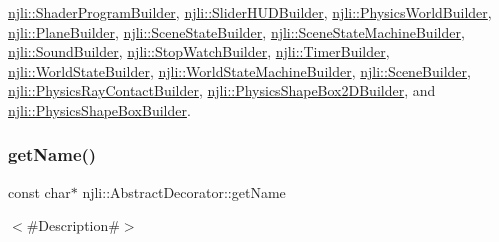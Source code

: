 \mbox{\hyperlink{classnjli_1_1_shader_program_builder_a131e91d141b0223cedebc6171de59b9b}{njli\+::\+Shader\+Program\+Builder}}, \mbox{\hyperlink{classnjli_1_1_slider_h_u_d_builder_ad290f966d4e75c073125443cee217c23}{njli\+::\+Slider\+H\+U\+D\+Builder}}, \mbox{\hyperlink{classnjli_1_1_physics_world_builder_ab046eaf50c425ccf120a4bd6f8702fe0}{njli\+::\+Physics\+World\+Builder}}, \mbox{\hyperlink{classnjli_1_1_plane_builder_a54fa171ecbf4e38cc79d54ad5f9e6d92}{njli\+::\+Plane\+Builder}}, \mbox{\hyperlink{classnjli_1_1_scene_state_builder_a6321171363bce444496fca0e11290835}{njli\+::\+Scene\+State\+Builder}}, \mbox{\hyperlink{classnjli_1_1_scene_state_machine_builder_aecc17e1921cac1cda12579de778d737a}{njli\+::\+Scene\+State\+Machine\+Builder}}, \mbox{\hyperlink{classnjli_1_1_sound_builder_afdebffb655601f61975dcd60f0aa1e50}{njli\+::\+Sound\+Builder}}, \mbox{\hyperlink{classnjli_1_1_stop_watch_builder_a186409ee0a19e75489cdab4bcf580d3a}{njli\+::\+Stop\+Watch\+Builder}}, \mbox{\hyperlink{classnjli_1_1_timer_builder_ab904ab539708d20ec75bb79b257220be}{njli\+::\+Timer\+Builder}}, \mbox{\hyperlink{classnjli_1_1_world_state_builder_abc990ca34261391470dcde9253746cc6}{njli\+::\+World\+State\+Builder}}, \mbox{\hyperlink{classnjli_1_1_world_state_machine_builder_a23c20795eb84296c30fc813cb901f8e4}{njli\+::\+World\+State\+Machine\+Builder}}, \mbox{\hyperlink{classnjli_1_1_scene_builder_af0655e6ef38a89ff1c8d663d5163fc91}{njli\+::\+Scene\+Builder}}, \mbox{\hyperlink{classnjli_1_1_physics_ray_contact_builder_a55fed195f3192a411c978c18a21c816a}{njli\+::\+Physics\+Ray\+Contact\+Builder}}, \mbox{\hyperlink{classnjli_1_1_physics_shape_box2_d_builder_ae6471440a74be5d0aaf13df66ee076f2}{njli\+::\+Physics\+Shape\+Box2\+D\+Builder}}, and \mbox{\hyperlink{classnjli_1_1_physics_shape_box_builder_a81c30888998942dae14ca1ed4c766b10}{njli\+::\+Physics\+Shape\+Box\+Builder}}.

\mbox{\label{classnjli_1_1_abstract_builder_ad41266885be835f3ee602311e20877a4}} 
\subsubsection{\texorpdfstring{get\+Name()}{getName()}}
{\footnotesize\ttfamily const char$\ast$ njli\+::\+Abstract\+Decorator\+::get\+Name}

$<$\#\+Description\#$>$

